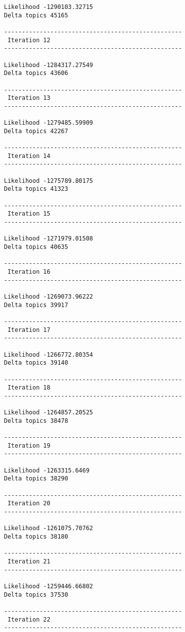 \documentclass{article}
\begin{document}
\begin{Verbatim}[commandchars=\\\{\}]
Likelihood -1290103.32715
Delta topics 45165 

-------------------------------------------------- 
 Iteration 12 
-------------------------------------------------- 

Likelihood -1284317.27549
Delta topics 43606 

-------------------------------------------------- 
 Iteration 13 
-------------------------------------------------- 

Likelihood -1279485.59909
Delta topics 42267 

-------------------------------------------------- 
 Iteration 14 
-------------------------------------------------- 

Likelihood -1275789.80175
Delta topics 41323 

-------------------------------------------------- 
 Iteration 15 
-------------------------------------------------- 

Likelihood -1271979.01508
Delta topics 40635 

-------------------------------------------------- 
 Iteration 16 
-------------------------------------------------- 

Likelihood -1269073.96222
Delta topics 39917 

-------------------------------------------------- 
 Iteration 17 
-------------------------------------------------- 

Likelihood -1266772.80354
Delta topics 39140 

-------------------------------------------------- 
 Iteration 18 
-------------------------------------------------- 

Likelihood -1264857.20525
Delta topics 38478 

-------------------------------------------------- 
 Iteration 19 
-------------------------------------------------- 

Likelihood -1263315.6469
Delta topics 38290 

-------------------------------------------------- 
 Iteration 20 
-------------------------------------------------- 

Likelihood -1261075.70762
Delta topics 38180 

-------------------------------------------------- 
 Iteration 21 
-------------------------------------------------- 

Likelihood -1259446.66802
Delta topics 37530 

-------------------------------------------------- 
 Iteration 22 
-------------------------------------------------- 


\end{Verbatim}
\end{document}
